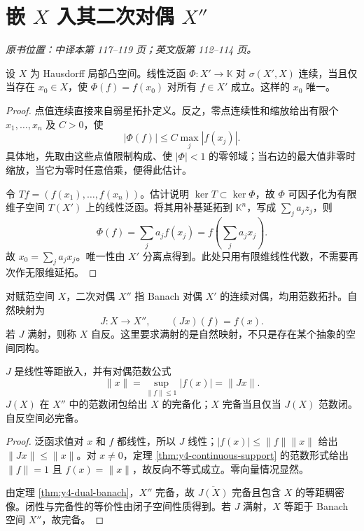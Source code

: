 \section{嵌 \texorpdfstring{$X$}{X} 入其二次对偶 \texorpdfstring{$X''$}{X''}}\label{sec:yosida-04-08}
\noindent\textit{原书位置：中译本第 117--119 页；英文版第 112--114 页。}

\begin{theorem}[弱星连续泛函恰是点值泛函]\label{thm:y4-weakstar-dual}
设 $X$ 为 Hausdorff 局部凸空间。线性泛函 $\Phi:X'\to\mathbb K$ 对 $\sigma(X',X)$ 连续，当且仅当存在 $x_0\in X$，使 $\Phi(f)=f(x_0)$ 对所有 $f\in X'$ 成立。这样的 $x_0$ 唯一。
\end{theorem}
\begin{proof}
点值连续直接来自弱星拓扑定义。反之，零点连续性和缩放给出有限个 $x_1,\ldots,x_n$ 及 $C>0$，使
\[
 |\Phi(f)|\le C\max_j|f(x_j)|.
\]
具体地，先取由这些点值限制构成、使 $|\Phi|<1$ 的零邻域；当右边的最大值非零时缩放，当它为零时任意倍乘，便得此估计。

令 $Tf=(f(x_1),\ldots,f(x_n))$。估计说明 $\ker T\subset\ker\Phi$，故 $\Phi$ 可因子化为有限维子空间 $T(X')$ 上的线性泛函。将其用补基延拓到 $\mathbb K^n$，写成 $\sum_j a_jz_j$，则
\[
 \Phi(f)=\sum_ja_jf(x_j)=f\left(\sum_ja_jx_j\right).
\]
故 $x_0=\sum_ja_jx_j$。唯一性由 $X'$ 分离点得到。此处只用有限维线性代数，不需要再次作无限维延拓。
\end{proof}

\begin{definition}[自然嵌入与自反性]\label{def:y4-bidual}
对赋范空间 $X$，二次对偶 $X''$ 指 Banach 对偶 $X'$ 的连续对偶，均用范数拓扑。自然映射为
\[
 J:X\to X'',\qquad (Jx)(f)=f(x).
\]
若 $J$ 满射，则称 $X$ 自反。这里要求满射的是自然映射，不只是存在某个抽象的空间同构。
\end{definition}

\begin{theorem}[自然嵌入等距]\label{thm:y4-canonical-isometry}
$J$ 是线性等距嵌入，并有对偶范数公式
\[
 \|x\|=\sup_{\|f\|\le1}|f(x)|=\|Jx\|.
\]
$J(X)$ 在 $X''$ 中的范数闭包给出 $X$ 的完备化；$X$ 完备当且仅当 $J(X)$ 范数闭。自反空间必完备。
\end{theorem}
\begin{proof}
泛函求值对 $x$ 和 $f$ 都线性，所以 $J$ 线性；$|f(x)|\le\|f\|\|x\|$ 给出 $\|Jx\|\le\|x\|$。对 $x\ne0$，定理 \ref{thm:y4-continuous-support} 的范数形式给出 $\|f\|=1$ 且 $f(x)=\|x\|$，故反向不等式成立。零向量情况显然。

由定理 \ref{thm:y4-dual-banach}，$X''$ 完备，故 $\overline{J(X)}$ 完备且包含 $X$ 的等距稠密像。闭性与完备性的等价性由闭子空间性质得到。若 $J$ 满射，$X$ 等距于 Banach 空间 $X''$，故完备。
\end{proof}

